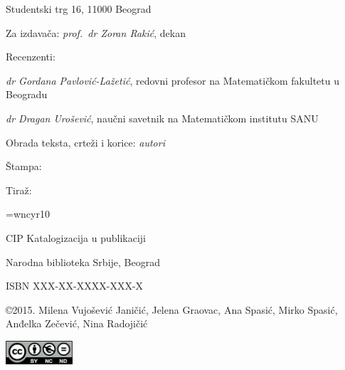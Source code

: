 Studentski trg 16, 11000 Beograd

\noindent
Za izdava\v{c}a: {\slshape prof.~dr Zoran Rakić}, dekan
\vspace*{3mm}

\noindent
Recenzenti:

\noindent
{\slshape dr Gordana Pavlović-Lažetić}, redovni profesor na Matematičkom fakultetu u Beogradu

\noindent
{\slshape dr Dragan Urošević}, naučni savetnik na Matematičkom institutu SANU
\vspace*{3mm}

\noindent
Obrada teksta, crteži i korice: {\slshape autori}


\ifstampanaverzija
\noindent
Štampa: %

\noindent
Tiraž: %
\vspace*{3mm}


\font\cyr=wncyr10

\noindent
CIP {\cyr Katalogizacija u publikaciji} 

\noindent
{\cyr Narodna biblioteka Srbije, Beograd}
\vspace*{1mm}

\else 
  \noindent ISBN XXX-XX-XXXX-XXX-X \vspace*{1cm}
\fi



\noindent
\copyright 2015. Milena Vujošević Janičić, Jelena Graovac, Ana Spasić, Mirko Spasić, Anđelka Zečević, Nina Radojičić



\vspace*{1mm}
\noindent\includegraphics[width=2.5cm]{cc.png}

\newpage
